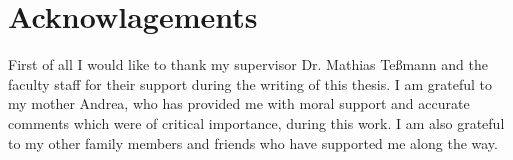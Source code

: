 
\chapter*{Acknowlagements}

First of all I would like to thank my supervisor Dr. Mathias Teßmann and the faculty staff for their support during the writing of this thesis. I am grateful to my mother Andrea, who has provided me with moral support and accurate comments which were of critical importance, during this work. I am also grateful to my other family members and friends who have supported me along the way.
